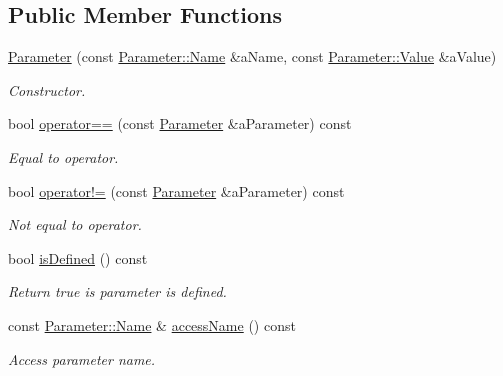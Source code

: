 \subsection*{Public Member Functions}
\begin{DoxyCompactItemize}
\item 
\hyperlink{classlibrary_1_1io_1_1url_1_1_query_1_1_parameter_ad6160646a07cb92213403426dbba4c64}{Parameter} (const \hyperlink{classlibrary_1_1io_1_1url_1_1_query_1_1_parameter_a7edf5fb8a4ae57aed1ce5dfa2405c981}{Parameter\+::\+Name} \&a\+Name, const \hyperlink{classlibrary_1_1io_1_1url_1_1_query_1_1_parameter_a46e7a7b97d44f51f83d6261f70ba0a5e}{Parameter\+::\+Value} \&a\+Value)
\begin{DoxyCompactList}\small\item\em Constructor. \end{DoxyCompactList}\item 
bool \hyperlink{classlibrary_1_1io_1_1url_1_1_query_1_1_parameter_ac00203e201de2c2e510ae59e01a9a12c}{operator==} (const \hyperlink{classlibrary_1_1io_1_1url_1_1_query_1_1_parameter}{Parameter} \&a\+Parameter) const
\begin{DoxyCompactList}\small\item\em Equal to operator. \end{DoxyCompactList}\item 
bool \hyperlink{classlibrary_1_1io_1_1url_1_1_query_1_1_parameter_a5c57390202d4bfb16ef94252f1d4618d}{operator!=} (const \hyperlink{classlibrary_1_1io_1_1url_1_1_query_1_1_parameter}{Parameter} \&a\+Parameter) const
\begin{DoxyCompactList}\small\item\em Not equal to operator. \end{DoxyCompactList}\item 
bool \hyperlink{classlibrary_1_1io_1_1url_1_1_query_1_1_parameter_a48b88317b02fd9551578b6828fa43933}{is\+Defined} () const
\begin{DoxyCompactList}\small\item\em Return true is parameter is defined. \end{DoxyCompactList}\item 
const \hyperlink{classlibrary_1_1io_1_1url_1_1_query_1_1_parameter_a7edf5fb8a4ae57aed1ce5dfa2405c981}{Parameter\+::\+Name} \& \hyperlink{classlibrary_1_1io_1_1url_1_1_query_1_1_parameter_a94a06afe8f529ffb1ee2488bb40bad62}{access\+Name} () const
\begin{DoxyCompactList}\small\item\em Access parameter name. \end{DoxyCompactList}\item 

\end{DoxyCompactItemize}
